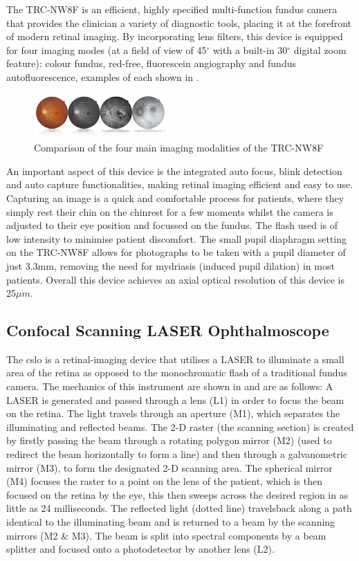 The TRC-NW8F is an efficient, highly specified multi-function fundus camera
that provides the clinician a variety of diagnostic tools, placing it at the
forefront of modern retinal imaging. By incorporating lens filters, this device
is equipped for four imaging modes (at a field of view of 45$^\circ$ with a
built-in 30$^\circ$ digital zoom feature): colour fundus, red-free, fluorescein
angiography and fundus autofluorescence, examples of each shown in .

\begin{figure}[H]
\centering
\includegraphics{figures/imagingmodes}
\caption{Comparison of the four main imaging modalities of the TRC-NW8F}
\label{fig:im}
\end{figure}


An important aspect of this device is the integrated auto focus, blink
detection and auto capture functionalities, making retinal imaging efficient
and easy to use. Capturing an image is a quick and comfortable process
for patients, where they simply rest their chin on the chinrest for a few
moments whilst the camera is adjusted to their eye position and focussed
on the fundus. The flash used is of low intensity to minimise patient
discomfort. The small pupil diaphragm setting on the TRC-NW8F allows
for photographs to be
taken with a pupil diameter of just 3.3mm, removing the need for mydriasis
(induced pupil dilation) in most patients. Overall this device achieves
an axial optical resolution of this device is 25$\mu m$.


\subsection{Confocal Scanning LASER Ophthalmoscope}

The \Gls{cslo} is a retinal-imaging device that utilises a LASER to illuminate a small area of the retina as
opposed to the monochromatic flash of a traditional fundus camera.
The mechanics of this instrument are shown in  and are as
follows: A LASER is generated and passed through a lens (L1) in order
to focus the beam on the retina. The light travels through an aperture (M1),
which separates the illuminating and reflected beams. The 2-D raster (the
scanning section) is created by firstly passing the beam through a rotating
polygon mirror (M2) (used to redirect the beam horizontally to form a line)
and then through a galvanometric mirror (M3), to form the designated 2-D
scanning area. The spherical mirror (M4) focuses the raster to a point
on the lens of the patient, which is then focused on the retina by the eye,
this then sweeps across the desired region in as little as 24 milliseconds.
The reflected light (dotted line) travelsback along a path identical to the
illuminating beam and is returned to a beam by the scanning mirrors (M2 \&
M3). The beam is split into spectral components by a beam splitter and
focused onto a photodetector by another lens (L2).\cite{webb1987confocal}

